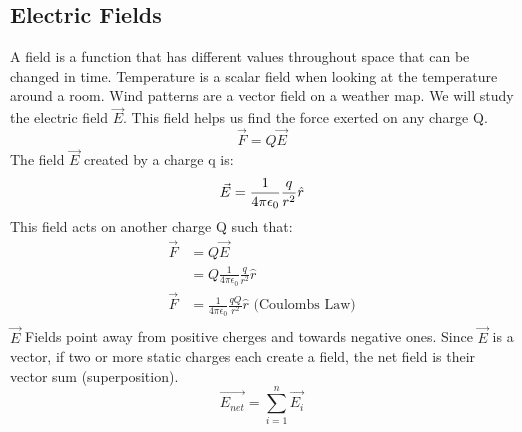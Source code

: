   \subsection{Electric Fields}
  A field is a function that has different values throughout space that can be changed in time. Temperature is a scalar field when looking at the temperature around a room. Wind patterns are a vector field on a weather map. We will study the electric field $\vec{E}$. This field helps us find the force exerted on any charge Q.
  \begin{equation*}
    \vec{F}=Q\vec{E}
  \end{equation*}
  The field $\vec{E}$ created by a charge q is:
  \begin{equation*}
    \vec{E}=\frac{1}{4\pi\epsilon_0}\frac{q}{r^2}\hat{r}\\
  \end{equation*}
  This field acts on another charge Q such that:
  \begin{align*}
    \vec{F}&=Q\vec{E}\\
    &=Q\frac{1}{4\pi\epsilon_0}\frac{q}{r^2}\hat{r}\\
    \vec{F}&=\frac{1}{4\pi\epsilon_0}\frac{qQ}{r^2}\hat{r} \text{ (Coulombs Law)}\\
  \end{align*}
  $\vec{E}$ Fields point away from positive cherges and towards negative ones. Since $\vec{E}$ is a vector, if two or more static charges each create a field, the net field is their vector sum (superposition).
  \begin{equation*}
    \vec{E_{net}}=\sum_{i=1}^n\vec{E_i}
  \end{equation*}
